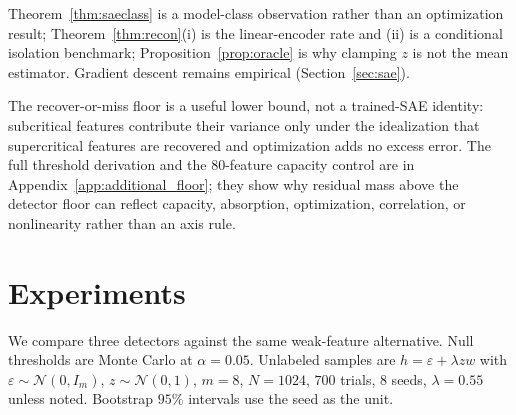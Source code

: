 \documentclass{article}
\theoremstyle{plain}
\begin{document}
Theorem~\ref{thm:saeclass} is a model-class observation rather than an optimization result; Theorem~\ref{thm:recon}(i) is the linear-encoder rate and (ii) is a conditional isolation benchmark; Proposition~\ref{prop:oracle} is why clamping $z$ is not the mean estimator. Gradient descent remains empirical (Section~\ref{sec:sae}).
\FloatBarrier

The recover-or-miss floor is a useful lower bound, not a trained-SAE identity: subcritical features contribute their variance only under the idealization that supercritical features are recovered and optimization adds no excess error. The full threshold derivation and the $80$-feature capacity control are in Appendix~\ref{app:additional_floor}; they show why residual mass above the detector floor can reflect capacity, absorption, optimization, correlation, or nonlinearity rather than an axis rule.
\FloatBarrier

\section{Experiments}
\label{sec:exp}

We compare three detectors against the same weak-feature alternative. Null thresholds are Monte Carlo at $\alpha=0.05$. Unlabeled samples are $h=\varepsilon+\lambda z w$ with $\varepsilon\sim\mathcal{N}(0,I_m)$, $z\sim\mathcal{N}(0,1)$, $m=8$, $N=1024$, $700$ trials, $8$ seeds, $\lambda=0.55$ unless noted. Bootstrap $95\%$ intervals use the seed as the unit.

\end{document}
